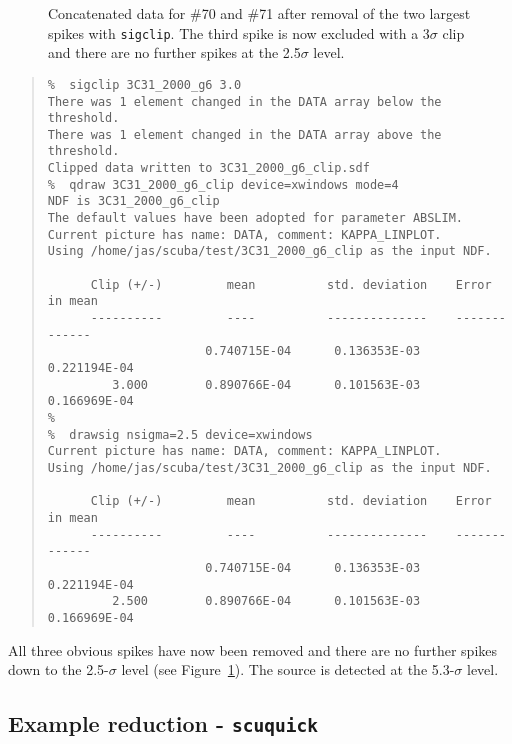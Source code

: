 \documentclass[twoside,11pt,fleqn]{article}
\newenvironment{myquote}{\begin{quote}\begin{small}}{\end{small}\end{quote}}
\begin{document}
\begin{figure}
\caption{Concatenated data for \#70 and \#71 after removal of the
two largest spikes with {\tt sigclip}. The third spike is now excluded
with a 3$\sigma$ clip and there are no further spikes at the 2.5$\sigma$ level.}
\label{f2}
\end{figure}

\begin{myquote}
\begin{verbatim}
%  sigclip 3C31_2000_g6 3.0
There was 1 element changed in the DATA array below the threshold.
There was 1 element changed in the DATA array above the threshold.
Clipped data written to 3C31_2000_g6_clip.sdf
%  qdraw 3C31_2000_g6_clip device=xwindows mode=4
NDF is 3C31_2000_g6_clip
The default values have been adopted for parameter ABSLIM.
Current picture has name: DATA, comment: KAPPA_LINPLOT.
Using /home/jas/scuba/test/3C31_2000_g6_clip as the input NDF.

      Clip (+/-)         mean          std. deviation    Error in mean
      ----------         ----          --------------    -------------
                      0.740715E-04      0.136353E-03      0.221194E-04
         3.000        0.890766E-04      0.101563E-03      0.166969E-04
%
%  drawsig nsigma=2.5 device=xwindows
Current picture has name: DATA, comment: KAPPA_LINPLOT.
Using /home/jas/scuba/test/3C31_2000_g6_clip as the input NDF.

      Clip (+/-)         mean          std. deviation    Error in mean
      ----------         ----          --------------    -------------
                      0.740715E-04      0.136353E-03      0.221194E-04
         2.500        0.890766E-04      0.101563E-03      0.166969E-04
\end{verbatim}
\end{myquote}

All three obvious spikes have now been removed and there are no
further spikes down to the 2.5-$\sigma$ level (see Figure~\ref{f2}). The source
is detected at the 5.3-$\sigma$ level.

\subsection{Example reduction - {\tt scuquick}}
\end{document}

